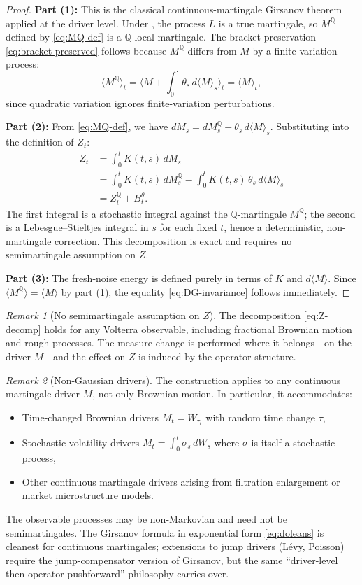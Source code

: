 \documentclass[11pt]{article}
\theoremstyle{plain}
\theoremstyle{definition}
\theoremstyle{remark}
\newtheorem{remark}{Remark}[section]
\newcommand{\QQ}{\mathbb{Q}}
\newcommand{\bracket}[1]{\langle #1 \rangle}
\begin{document}
\begin{proof}
\textbf{Part (1):} This is the classical continuous-martingale Girsanov theorem
applied at the driver level. Under , the process $L$ is a
true martingale, so $M^{\QQ}$ defined by \eqref{eq:MQ-def} is a $\QQ$-local
martingale. The bracket preservation \eqref{eq:bracket-preserved} follows
because $M^{\QQ}$ differs from $M$ by a finite-variation process:
\[
\bracket{M^{\QQ}}_t = \bracket{M + \int_0^\cdot \theta_s\,d\bracket{M}_s}_t
= \bracket{M}_t,
\]
since quadratic variation ignores finite-variation perturbations.

\textbf{Part (2):} From \eqref{eq:MQ-def}, we have
$dM_s = dM_s^{\QQ} - \theta_s\,d\bracket{M}_s$. Substituting into the
definition of $Z_t$:
\begin{align*}
Z_t &= \int_0^t K(t,s)\,dM_s \\
&= \int_0^t K(t,s)\,dM_s^{\QQ} - \int_0^t K(t,s)\,\theta_s\,d\bracket{M}_s \\
&= Z_t^{\QQ} + B_t^\theta.
\end{align*}
The first integral is a stochastic integral against the $\QQ$-martingale
$M^{\QQ}$; the second is a Lebesgue--Stieltjes integral in $s$ for each
fixed $t$, hence a deterministic, non-martingale correction. This
decomposition is exact and requires no semimartingale assumption on $Z$.

\textbf{Part (3):} The fresh-noise energy is defined purely in terms of
$K$ and $d\bracket{M}$. Since $\bracket{M^{\QQ}} = \bracket{M}$ by part (1),
the equality \eqref{eq:DG-invariance} follows immediately.
\end{proof}

\begin{remark}[No semimartingale assumption on $Z$]
The decomposition \eqref{eq:Z-decomp} holds for any Volterra observable,
including fractional Brownian motion and rough processes. The measure change
is performed where it belongs---on the driver $M$---and the effect on $Z$
is induced by the operator structure.
\end{remark}

\begin{remark}[Non-Gaussian drivers]\label{rem:non-gaussian}
The construction applies to any continuous martingale driver $M$, not only
Brownian motion. In particular, it accommodates:
\begin{itemize}
\item Time-changed Brownian drivers $M_t = W_{\tau_t}$ with random time change $\tau$,
\item Stochastic volatility drivers $M_t = \int_0^t \sigma_s\,dW_s$ where $\sigma$ is
itself a stochastic process,
\item Other continuous martingale drivers arising from filtration enlargement or
market microstructure models.
\end{itemize}
The observable processes may be non-Markovian and need not be
semimartingales. The Girsanov formula in exponential form \eqref{eq:doleans}
is cleanest for continuous martingales; extensions to jump drivers (L\'evy,
Poisson) require the jump-compensator version of Girsanov, but the same
``driver-level then operator pushforward'' philosophy carries over.
\end{remark}
\end{document}
